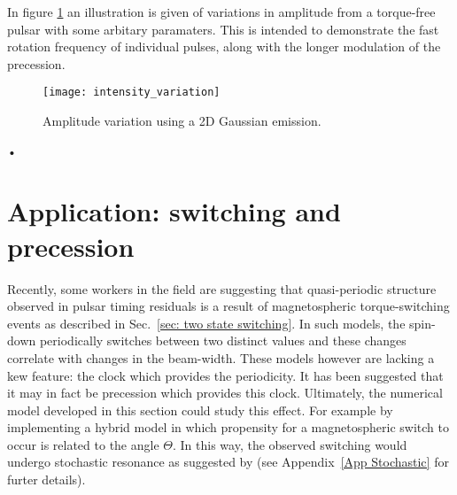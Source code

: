 \documentclass[../full_thesis/full_thesis.tex]{subfiles}
\begin{document}
In figure \ref{fig: amplitude variation} an illustration is given of variations
in amplitude from a torque-free pulsar with some arbitary paramaters. This is
intended to demonstrate the fast rotation frequency of individual pulses, along
with the longer modulation of the precession.
\begin{figure}[htb]
\centering
\texttt{[image: intensity\_variation]}
\caption{Amplitude variation using a 2D Gaussian emission.}
\label{fig: amplitude variation}
\end{figure}•


\section{Application: switching and precession}

Recently, some workers in the field \citep{Lyne2010, Perera2015} are suggesting
that quasi-periodic structure observed in pulsar timing residuals is a result
of magnetospheric torque-switching events as described in Sec.~\ref{sec: two
state switching}. In such models, the spin-down periodically switches between
two distinct values and these changes correlate with changes in the beam-width.
These models however are lacking a kew feature: the clock which provides the
periodicity. It has been suggested \citep{Jones2012} that it may in fact be
precession which provides this clock. Ultimately, the numerical model developed
in this section could study this effect. For example by implementing a hybrid
model in which propensity for a magnetospheric switch to occur is related to
the angle $\Theta$. In this way, the observed switching would undergo
stochastic resonance as suggested by \citet{Cordes2013} (see Appendix~\ref{App
Stochastic} for furter details).
\end{document}

